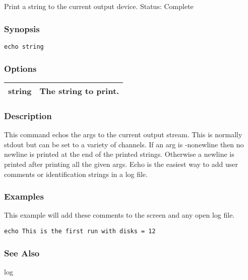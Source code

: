 \subsection{}
\label{echo}
Print a string to the current output device. 
 Status: Complete
\subsubsection*{Synopsis}
\begin{verbatim}
echo string
\end{verbatim}
\subsubsection*{Options}
\begin{tabular}{|l|l|}
\hline 
 string  & The string to print.  \\
 \hline 
\end{tabular}
\subsubsection*{Description}
 This command echos the args to the current output stream. This is normally stdout but can be set to a variety of channels. If an arg is -nonewline then no newline is printed at the end of the printed strings. Otherwise a newline is printed after printing all the given args. Echo is the easiest way to add user comments or identification strings in a log file. 
\subsubsection*{Examples}
 This example will add these comments to the screen and any open log file. \begin{verbatim}
echo This is the first run with disks = 12
\end{verbatim}
\subsubsection*{See Also}
 log
